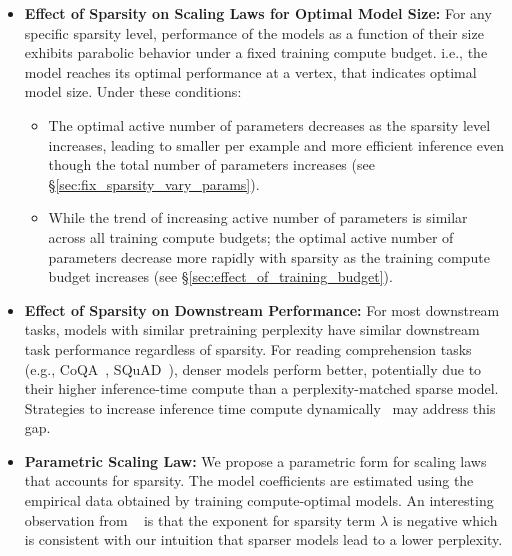 \begin{itemize}[leftmargin=*]
    \item \textbf{Effect of Sparsity on Scaling Laws for Optimal Model Size:} For any specific sparsity level, performance of the models as a function of their size exhibits parabolic behavior under a fixed training compute budget. i.e., the model reaches its optimal performance at a vertex, that indicates optimal model size.
    Under these conditions:
     \begin{itemize}
     \setlength{\itemindent}{0pt}  %
     \setlength{\leftmargin}{0pt}  %
      \item The optimal active number of parameters decreases as the sparsity level increases, leading to smaller \flops per example and more efficient inference even though the total number of parameters increases (see \S\ref{sec:fix_sparsity_vary_params}).
      \item While the trend of increasing active number of parameters is similar across all training compute budgets; the optimal active number of parameters decrease more rapidly with sparsity as the training compute budget increases (see \S\ref{sec:effect_of_training_budget}). 
\end{itemize}
    \item \textbf{Effect of Sparsity on Downstream Performance:} For most downstream tasks, models with similar pretraining perplexity have similar downstream task performance regardless of sparsity. For reading comprehension tasks (e.g., CoQA~\citep{reddy-etal-2019-coqa}, SQuAD~\citep{rajpurkar-etal-2018-know}), denser models perform better, potentially due to their higher inference-time compute than a perplexity-matched sparse model. Strategies to increase inference time compute dynamically~\citep{wei2022chain_cot,goyal2024think_pause} may address this gap. 

    \item \textbf{Parametric Scaling Law:} We propose a parametric form for scaling laws that accounts for sparsity. The model coefficients are estimated using the empirical data obtained by training compute-optimal models. An interesting observation from ~ is that the exponent for sparsity term $\lambda$ is negative which is consistent with our intuition that sparser models lead to a lower perplexity. 
\end{itemize}

